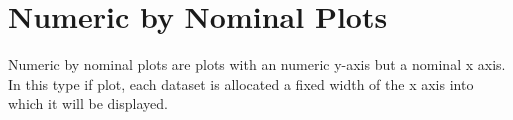 \documentclass{article}
\begin{document}
\section{\label{sect:num-by-nom} Numeric by Nominal Plots}

Numeric by nominal plots are plots with an numeric y-axis but a
nominal x axis.  In this type if plot, each dataset is allocated a
fixed width of the x axis into which it will be displayed.
\end{document}
